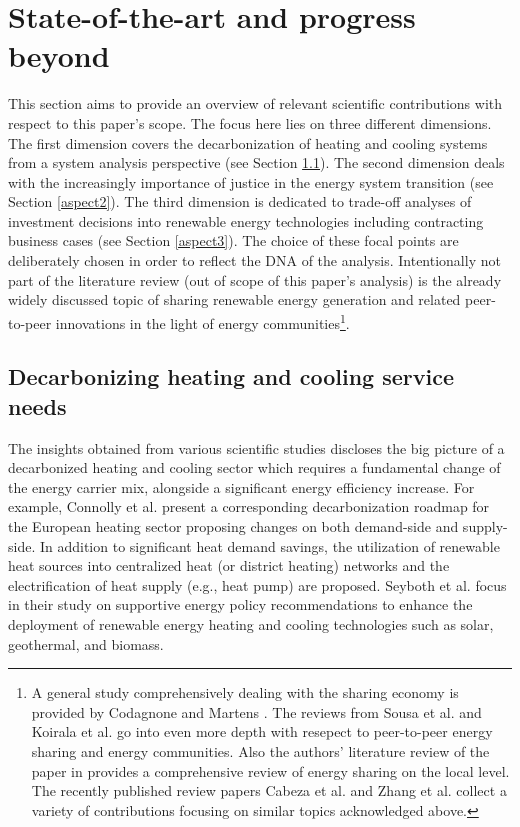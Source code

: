 \section{State-of-the-art and progress beyond}\label{stateoftheart}
This section aims to provide an overview of relevant scientific contributions with respect to this paper's scope. The focus here lies on three different dimensions. The first dimension covers the decarbonization of heating and cooling systems from a system analysis perspective (see Section \ref{aspect1}). The second dimension deals with the increasingly importance of justice in the energy system transition (see Section \ref{aspect2}). The third dimension is dedicated to trade-off analyses of investment decisions into renewable energy technologies including contracting business cases (see Section \ref{aspect3}). The choice of these focal points are deliberately chosen in order to reflect the DNA of the analysis. Intentionally not part of the literature review (out of scope of this paper's analysis) is the already widely discussed topic of sharing renewable energy generation and related peer-to-peer innovations in the light of energy communities\footnote{A general study comprehensively dealing with the sharing economy is provided by Codagnone and Martens \cite{codagnone2016scoping}. The reviews from Sousa et al. \cite{sousa2019peer} and Koirala et al. \cite{koirala2016energetic} go into even more depth with resepect to peer-to-peer energy sharing and energy communities. Also the authors' literature review of the paper in \cite{zwickl2021open} provides a comprehensive review of energy sharing on the local level. The recently published review papers Cabeza et al. \cite{cabeza2018integration} and Zhang et al. \cite{zhang2019review} collect a variety of contributions focusing on similar topics acknowledged above.}.

\subsection{Decarbonizing heating and cooling service needs}\label{aspect1}
The insights obtained from various scientific studies discloses the big picture of a decarbonized heating and cooling sector which requires a fundamental change of the energy carrier mix, alongside a significant energy efficiency increase. For example, Connolly et al. \cite{connolly2014heat} present a corresponding decarbonization roadmap for the European heating sector proposing changes on both demand-side and supply-side. In addition to significant heat demand savings, the utilization of renewable heat sources into centralized heat (or district heating) networks and the electrification of heat supply (e.g., heat pump) are proposed. Seyboth et al. \cite{seyboth2008recognising} focus in their study on supportive energy policy recommendations to enhance the deployment of renewable energy heating and cooling technologies such as solar, geothermal, and biomass.\vspace{0.5cm}

